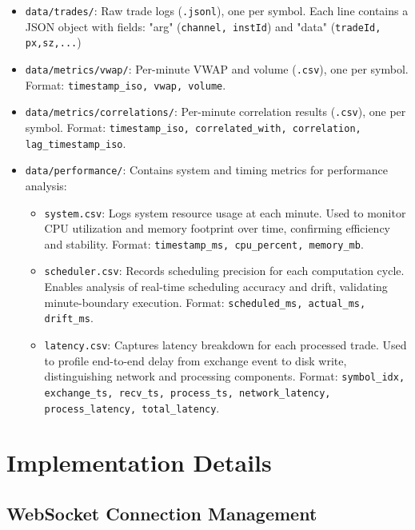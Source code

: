 \documentclass[12pt,a4paper]{article}
\begin{document}
\begin{itemize}
    
    \item \texttt{data/trades/}: Raw trade logs (\texttt{.jsonl}), one per symbol. Each line contains a JSON object with fields: "arg" (\texttt{channel, instId}) and "data" (\texttt{tradeId, px,sz,...})
    
    \item \texttt{data/metrics/vwap/}: Per-minute VWAP and volume (\texttt{.csv}), one per symbol. Format: \texttt{timestamp\_iso, vwap, volume}.
    
    \item \texttt{data/metrics/correlations/}: Per-minute correlation results (\texttt{.csv}), one per symbol. Format: \texttt{timestamp\_iso, correlated\_with, correlation, lag\_timestamp\_iso}.

    \item \texttt{data/performance/}: Contains system and timing metrics for performance analysis:
        \begin{itemize}
        \item \texttt{system.csv}: Logs system resource usage at each minute. Used to monitor CPU utilization and memory footprint over time, confirming efficiency and stability. Format: 
        \texttt{timestamp\_ms, cpu\_percent, memory\_mb}. 
        
        \item \texttt{scheduler.csv}: Records scheduling precision for each computation cycle. Enables analysis of real-time scheduling accuracy and drift, validating minute-boundary execution. Format: \texttt{scheduled\_ms, actual\_ms, drift\_ms}.
        
        \item \texttt{latency.csv}: Captures latency breakdown for each processed trade. Used to profile end-to-end delay from exchange event to disk write, distinguishing network and processing components. Format: \texttt{symbol\_idx, exchange\_ts, recv\_ts, process\_ts, network\_latency, process\_latency, total\_latency}. 

    \end{itemize}
\end{itemize}

\section{Implementation Details}

\subsection{WebSocket Connection Management}
\end{document}
